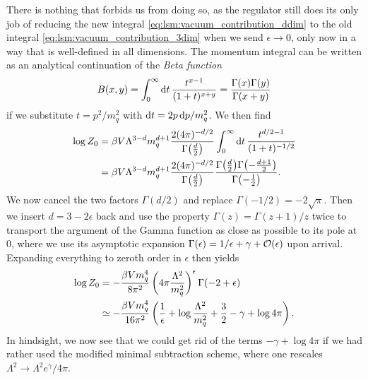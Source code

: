 There is nothing that forbids us from doing so, 
as the regulator still does its only job of reducing the new integral \eqref{eq:lsm:vacuum_contribution_ddim} to the old integral \eqref{eq:lsm:vacuum_contribution_3dim} when we send $\epsilon \rightarrow 0$,
only now in a way that is well-defined in all dimensions.
The momentum integral can be written as an analytical continuation of the \emph{Beta function} \cite{ref:beta_function}
\begin{equation}
	B(x,y) = \int_0^\infty \mathop{}\!\mathrm{d} t \, \frac{t^{x-1}}{(1+t)^{x+y}} = \frac{\Gamma(x) \Gamma(y)}{\Gamma(x+y)}
\end{equation}
if we substitute $t = p^2/m_q^2$ with $\mathop{}\!\mathrm{d} t = 2 p \mathop{}\!\mathrm{d} p / m_q^2$.
We then find
\begin{equation}
\begin{split}
	\log Z_0 &= \beta V \Lambda^{3-d} m_q^{d+1} \frac{2 (4 \pi)^{-d/2}}{\Gamma\big(\frac{d}{2}\big)} \int_0^\infty \mathop{}\!\mathrm{d} t \, \frac{t^{d/2-1}}{(1+t)^{-1/2}} \\
	         &= \beta V \Lambda^{3-d} m_q^{d+1} \frac{2 (4 \pi)^{-d/2}}{\Gamma\big(\frac{d}{2}\big)} \frac{\Gamma\big(\frac{d}{2}\big) \Gamma\big( \textstyle{-\frac{d+1}{2}} \big)}{\Gamma\big( \textstyle{-\frac{1}{2}} \big)} .
\end{split}
\end{equation}
We now cancel the two factors $\Gamma(d/2)$ and replace $\Gamma(-1/2) = -2\sqrt{\pi}$.
Then we insert $d = 3 - 2 \epsilon$ back and use the property $\Gamma(z) = \Gamma(z+1) / z$ twice to transport the argument of the Gamma function as close as possible to its pole at $0$,
where we use its asymptotic expansion $\Gamma(\epsilon) = 1/\epsilon + \gamma + \mathcal{O}(\epsilon)$ upon arrival.
Expanding everything to zeroth order in $\epsilon$ then yields
\begin{equation}
\begin{split}
	\log Z_0 &=       -\frac{\beta V m_q^4}{8 \pi^2} \left( 4 \pi \frac{\Lambda^2}{m_q^2} \right)^\epsilon \Gamma(-2 + \epsilon) \\
	         &\simeq -\frac{\beta V m_q^4}{16 \pi^2} \left( \frac{1}{\epsilon} + \log \frac{\Lambda^2}{m_q^2} + \frac32 - \gamma + \log 4 \pi \right) .
\end{split}
\label{eq:lsm:vacuum_contribution_final}
\end{equation}
In hindsight, we now see that we could get rid of the terms $-\gamma + \log 4 \pi$ if we had rather used the modified minimal subtraction scheme, where one rescales $\Lambda^2 \rightarrow \Lambda^2 e^\gamma / 4 \pi$.

